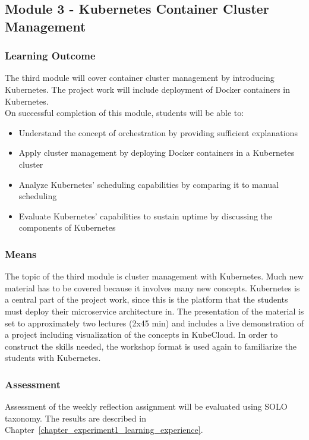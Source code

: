 \subsection*{Module 3 - Kubernetes Container Cluster Management}
\subsubsection*{Learning Outcome}
The third module will cover container cluster management by introducing Kubernetes. The project work will include deployment of Docker containers in Kubernetes. \\

\noindent
On successful completion of this module, students will be able to:
\begin{itemize}
    \item Understand the concept of orchestration by providing sufficient explanations
     \item Apply cluster management by deploying Docker containers in a Kubernetes cluster
    \item Analyze Kubernetes' scheduling capabilities by comparing it to manual scheduling
    \item Evaluate Kubernetes' capabilities to sustain uptime by discussing the components of Kubernetes

\end{itemize}

\subsubsection*{Means}
The topic of the third module is cluster management with Kubernetes. Much new material has to be covered because it involves many new concepts. Kubernetes is a central part of the project work, since this is the platform that the students must deploy their microservice architecture in. The presentation of the material is set to approximately two lectures (2x45 min) and includes a live demonstration of a project including visualization of the concepts in KubeCloud. In order to construct the skills needed, the workshop format is used again to familiarize the students with Kubernetes.

\subsubsection*{Assessment}
Assessment of the weekly reflection assignment will be evaluated using SOLO taxonomy. The results are described in Chapter~\ref{chapter_experiment1_learning_experience}. 

